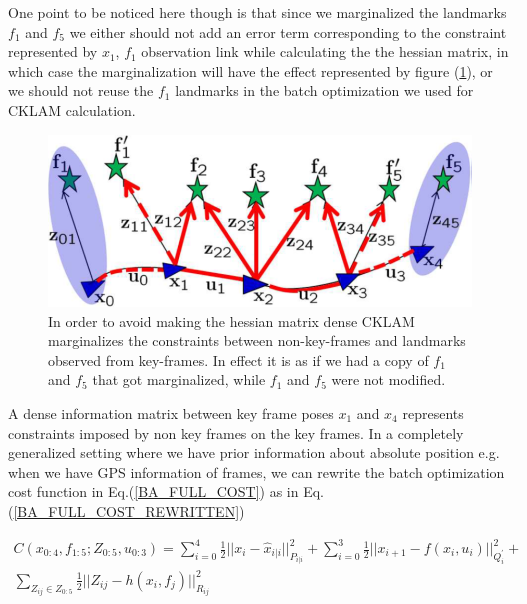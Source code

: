 One point to be noticed here though is that since we marginalized the landmarks $f_1$ and $f_5$ we either should not add an error term corresponding to the constraint represented by $x_1$, $f_1$ observation link while calculating the the hessian matrix, in which case the marginalization will have the effect represented by figure (\ref{fig:CKLAMMarginalizationFeatureClone}), or we should not reuse the $f_1$ landmarks in the batch optimization we used for CKLAM calculation. 

\begin{figure}[ht]
	\centering
		\includegraphics[width=1.00\textwidth]{images/CKLAMMarginalizationFeatureClone.png}
  \caption{In order to avoid making the hessian matrix dense CKLAM marginalizes the constraints between non-key-frames and landmarks observed from key-frames. In effect it is as if we had a copy of $f_1$ and $f_5$ that got marginalized, while $f_1$ and $f_5$ were not modified. \cite{CKLAM}}
  \label{fig:CKLAMMarginalizationFeatureClone}
\end{figure}

A dense information matrix between key frame poses $x_1$ and $x_4$ represents constraints imposed by non key frames on the key frames. In a completely generalized setting where we have prior information about absolute position e.g. when we have GPS information of frames, we can rewrite the batch optimization cost function in Eq.(\ref{BA_FULL_COST}) as in Eq.(\ref{BA_FULL_COST_REWRITTEN})

\begin{equation}
  \begin{split}
    C(x_{0:4},f_{1:5};Z_{0:5},u_{0:3}) = \sum_{i=0}^4 \frac{1}{2}||x_i-\hat x_{i|i}||^2_{P_{i|i}} + \sum_{i=0}^3 {\frac{1}{2}||x_{i+1} - f(x_i, u_i)||^2_{Q_i^{'}}} +\\ \sum_{Z_{ij}\in Z_{0:5}} {\frac{1}{2}||Z_{ij}-h(x_i,f_j)||^2_{R_{ij}}}
    \label{BA_FULL_COST_REWRITTEN}
  \end{split}
\end{equation}

